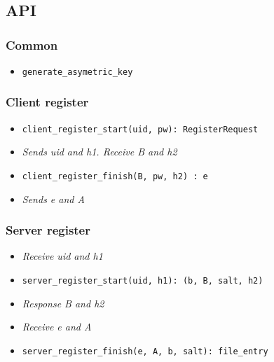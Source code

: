 \documentclass[../report.tex]{subfiles}
\begin{document}
\chapter{}
\section{API}

\subsection{Common}
\begin{itemize}
 \item \verb|generate_asymetric_key|
\end{itemize}


\subsection{Client register}
\begin{itemize}
 \item \verb|client_register_start(uid, pw): RegisterRequest|
 \item \emph{Sends uid and h1. Receive B and h2}
 \item \verb|client_register_finish(B, pw, h2) : e|
 \item \emph{Sends e and A}
\end{itemize}


\subsection{Server register}
\begin{itemize}
 \item \emph{Receive uid and h1}
 \item \verb|server_register_start(uid, h1): (b, B, salt, h2)|
 \item \emph{Response B and h2}
 \item \emph{Receive e and A}
 \item \verb|server_register_finish(e, A, b, salt): file_entry|
\end{itemize}
\end{document}

